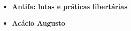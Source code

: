 \begin{itemize}
\item \textbf{Antifa: lutas e práticas libertárias} \lipsum[1]

\item \textbf{Acácio Augusto} \lipsum[1]

\end{itemize}

